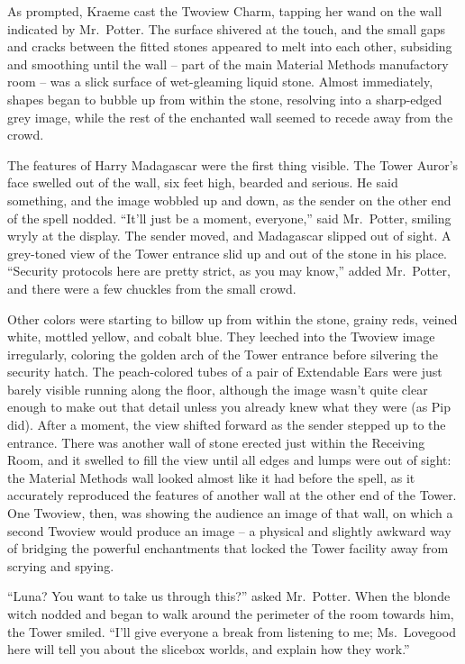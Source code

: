 As prompted, Kraeme cast the Twoview Charm, tapping her wand on the wall
indicated by Mr.~Potter. The surface shivered at the touch, and the
small gaps and cracks between the fitted stones appeared to melt into
each other, subsiding and smoothing until the wall -- part of the main
Material Methods manufactory room -- was a slick surface of wet-gleaming
liquid stone. Almost immediately, shapes began to bubble up from within
the stone, resolving into a sharp-edged grey image, while the rest of
the enchanted wall seemed to recede away from the crowd.

The features of Harry Madagascar were the first thing visible. The Tower
Auror's face swelled out of the wall, six feet high, bearded and
serious. He said something, and the image wobbled up and down, as the
sender on the other end of the spell nodded. ``It'll just be a moment,
everyone,'' said Mr.~Potter, smiling wryly at the display. The sender
moved, and Madagascar slipped out of sight. A grey-toned view of the
Tower entrance slid up and out of the stone in his place. ``Security
protocols here are pretty strict, as you may know,'' added Mr.~Potter,
and there were a few chuckles from the small crowd.

Other colors were starting to billow up from within the stone, grainy
reds, veined white, mottled yellow, and cobalt blue. They leeched into
the Twoview image irregularly, coloring the golden arch of the Tower
entrance before silvering the security hatch. The peach-colored tubes of
a pair of Extendable Ears were just barely visible running along the
floor, although the image wasn't quite clear enough to make out that
detail unless you already knew what they were (as Pip did). After a
moment, the view shifted forward as the sender stepped up to the
entrance. There was another wall of stone erected just within the
Receiving Room, and it swelled to fill the view until all edges and
lumps were out of sight: the Material Methods wall looked almost like it
had before the spell, as it accurately reproduced the features of
another wall at the other end of the Tower. One Twoview, then, was
showing the audience an image of that wall, on which a second Twoview
would produce an image -- a physical and slightly awkward way of
bridging the powerful enchantments that locked the Tower facility away
from scrying and spying.

``Luna? You want to take us through this?'' asked Mr.~Potter. When the
blonde witch nodded and began to walk around the perimeter of the room
towards him, the Tower smiled. ``I'll give everyone a break from
listening to me; Ms.~Lovegood here will tell you about the slicebox
worlds, and explain how they work.''

